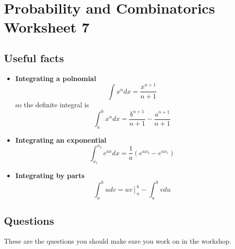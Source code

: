 \documentclass[11pt,a4paper]{scrartcl}
\begin{document}
\section*{Probability and Combinatorics Worksheet 7}

\subsection*{Useful facts}

\begin{itemize}


\item \textbf{Integrating a polnomial}
\begin{equation}
\int x^n dx=\frac{x^{n+1}}{n+1}
\end{equation}
so the definite integral is
\begin{equation}
\int_{a}^b x^n dx=\frac{b^{n+1}}{n+1}-\frac{a^{n+1}}{n+1}
\end{equation}


\item \textbf{Integrating an exponential}
\begin{equation}
\int_{x_1}^{x_2} e^{ax} dx=\frac{1}{a}\left(e^{ax_2}-e^{ax_1}\right)
\end{equation}

\item \textbf{Integrating by parts}
  \begin{equation}
    \int_a^b udv = \left.uv\right]_a^b -\int_a^b vdu
  \end{equation}
  
  
\end{itemize}



\subsection*{Questions}

These are the questions you should make sure you work on in the workshop.
\end{document}
